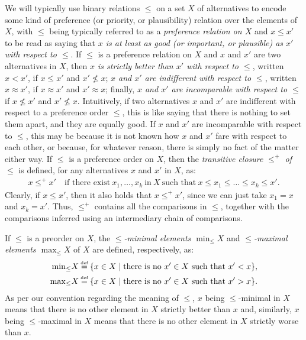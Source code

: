 We will typically use binary relations $\le$ on a set $X$ of alternatives
to encode some kind of preference 
(or priority, or plausibility) relation over the elements of $X$,
with 
$\le$ being typically referred to as a \emph{preference relation on $X$}
and $x\le x'$ to be read as saying that 
\emph{$x$ is at least as good (or important, or plausible) as $x'$ with respect to $\le$}.
If $\le$ is a preference relation on $X$
and $x$ and $x'$ are two alternatives in $X$, then 
\emph{$x$ is strictly better than $x'$ with respect to $\le$},
written $x<x'$, if $x\le x'$ and $x'\not\le x$;
\emph{$x$ and $x'$ are indifferent with respect to $\le$},
written $x\approx x'$, if $x\approx x'$ and $x'\approx x$;
finally, \emph{$x$ and $x'$ are incomparable with respect to $\le$}
if $x\not\le x'$ and $x'\not\le x$.
Intuitively, if two alternatives $x$ and $x'$ are indifferent with respect 
to a preference order $\le$, this is like saying that there is 
nothing to set them apart, and they are equally good.
If $x$ and $x'$ are incomparable with respect to $\le$, this may be 
because it is not known how $x$ and $x'$ fare 
with respect to each other, or because, for whatever reason,
there is simply no fact of the matter either way.
If $\le$ is a preference order on $X$,
then the \emph{transitive closure $\le^+$ of $\le$} is defined, 
for any alternatives $x$ and $x'$ in $X$, as:
\begin{align*}
	x\le^+ x'	&~\text{if there exist}~x_1,\dots,x_k~\text{in}~X~\text{such that}~x \le x_1 \le\dots\le x_k\le x'.
\end{align*}
Clearly, if $x\le x'$, then it also holds that $x\le^+ x'$, since we can just
take $x_1 = x$ and $x_k = x'$.
Thus, $\le^+$ contains all the comparisons in $\le$, together 
with the comparisons inferred using an intermediary chain of comparisons.

If $\le$ is a preorder on $X$, 
the \emph{$\le$-minimal	elements $\min_\le X$} 
and \emph{$\le$-maximal elements $\max_\le X$} of $X$ 
are defined, respectively, as:
\begin{align*}
	\min_\le X &\defeq\{x\in X\mid\text{there is no}~x'\in X~\text{such that}~x'<x\},\\ 
	\max_\le X &\defeq\{x\in X\mid\text{there is no}~x'\in X~\text{such that}~x'>x\}.
\end{align*}
As per our convention regarding the meaning of $\le$, 
$x$ being $\le$-minimal in $X$ means that 
there is no other element in $X$ strictly better than $x$
and, similarly,
$x$ being $\le$-maximal in $X$ means that 
there is no other element in $X$ strictly worse than $x$.

